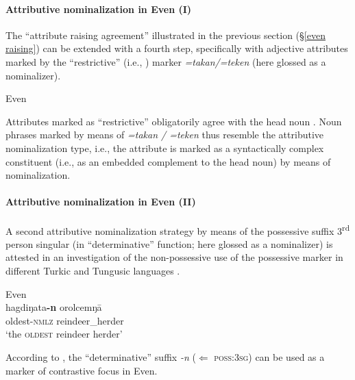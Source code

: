 \paragraph*{Attributive nominalization in Even (I)}
The “attribute raising agreement” illustrated in the previous section (\S\ref{even raising}) can be extended with a fourth step, specifically with adjective attributes marked by the “restrictive” (i.e., ) marker \textit{=takan/=teken} (here glossed as a nominalizer).
\begin{exe}
\ex 
{\rm Even \citep[32]{malchukov1995}}
\begin{xlist}
\end{xlist}
\end{exe}
Attributes marked as “restrictive” obligatorily agree with the head noun \citep[32]{malchukov1995}. Noun phrases marked by means of \textit{=takan / =teken} thus resemble the attributive nominalization type, i.e., the attribute is marked as a syntactically complex constituent (i.e., as an embedded complement to the head noun) by means of nominalization.

\paragraph*{Attributive nominalization in Even (II)}
A second attributive nominalization strategy by means of the possessive suffix 3\textsuperscript{rd} person singular (in “determinative” function; here glossed as a nominalizer) is attested in an investigation of the non-possessive use of the possessive marker in different Turkic and Tungusic languages \citep{benzing1993b}.
\begin{exe}
\ex 
{\rm Even \citep[17–18 Footnote 58]{benzing1993b}}\\
\gll	hagdiŋata\textbf{-n} orolcemŋā\\
	oldest-\textsc{nmlz} reindeer\_herder\\
\glt	‘the \textsc{oldest} reindeer herder’
\end{exe}
According to \citet[17–18 Footnote 58]{benzing1993b}, the “determinative” suffix \textit{-n} ($\Leftarrow$ \textsc{poss:3sg}) can be used as a marker of contrastive focus in Even.

